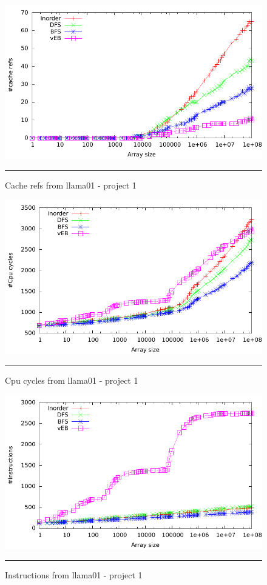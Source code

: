 \begin{figure}[ht]
	\centering
		\includegraphics[width=\textwidth]{./Appendices/Figures/Project1/Cache_refs-Putty.pdf}
		\rule{35em}{0.5pt}
	\caption*{
	Cache refs from llama01 - project 1
	}
	\label{fig:Cache_refs_p1putty}
\end{figure}
\begin{figure}[ht]
	\centering
		\includegraphics[width=\textwidth]{./Appendices/Figures/Project1/Cpu_cycles-Putty.pdf}
		\rule{35em}{0.5pt}
	\caption*{
	Cpu cycles from llama01 - project 1
	}
	\label{fig:Cpu_cycles_p1putty}
\end{figure}
\begin{figure}[ht]
	\centering
		\includegraphics[width=\textwidth]{./Appendices/Figures/Project1/Instructions-Putty.pdf}
		\rule{35em}{0.5pt}
	\caption*{
	Instructions from llama01 - project 1
	}
	\label{fig:Instructions_p1putty}
\end{figure}

